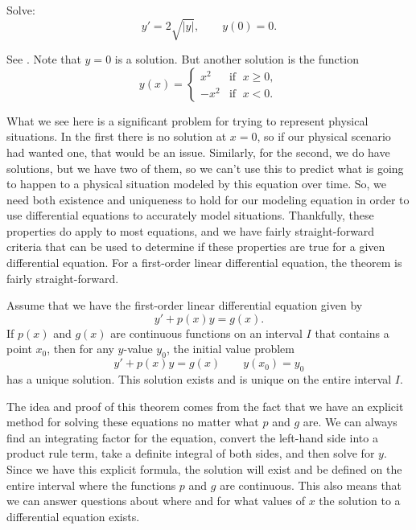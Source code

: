 \begin{example}\label{ex:nonuniqueness}
Solve:
\begin{equation*}
y' = 2 \sqrt{\lvert y \rvert}, \qquad y(0) = 0 .
\end{equation*}

See .
Note that $y=0$ is a solution.  But another solution is the function
\begin{equation*}
y(x) =
\begin{cases}
x^2 & \text{if } \; x \geq 0,\\
-x^2 & \text{if } \; x < 0.
\end{cases}
\end{equation*}
\end{example}

What we see here is a significant problem for trying to represent physical situations. In the first there is no solution at $x=0$, so if our physical scenario had wanted one, that would be an issue. Similarly, for the second, we do have solutions, but we have two of them, so we can't use this to predict what is going to happen to a physical situation modeled by this equation over time. So, we need both existence and uniqueness to hold for our modeling equation in order to use differential equations to accurately model situations. Thankfully, these properties do apply to most equations, and we have fairly straight-forward criteria that can be used to determine if these properties are true for a given differential equation. For a first-order linear differential equation, the theorem is fairly straight-forward.

\begin{theorem1}{}%
Assume that we have the first-order linear differential equation given by
\begin{equation*}
y' + p(x)y = g(x).
\end{equation*}
If $p(x)$ and $g(x)$ are continuous functions on an interval $I$ that contains a point $x_0$, then for any $y$-value $y_0$, the initial value problem
\begin{equation*}
y' + p(x)y = g(x) \qquad y(x_0) = y_0
\end{equation*}
has a unique solution. This solution exists and is unique on the entire interval $I$.
\end{theorem1}

The idea and proof of this theorem comes from the fact that we have an explicit method for solving these equations no matter what $p$ and $g$ are. We can always find an integrating factor for the equation, convert the left-hand side into a product rule term, take a definite integral of both sides, and then solve for $y$. Since we have this explicit formula, the solution will exist and be defined on the entire interval where the functions $p$ and $g$ are continuous. This also means that we can answer questions about where and for what values of $x$ the solution to a differential equation exists.

